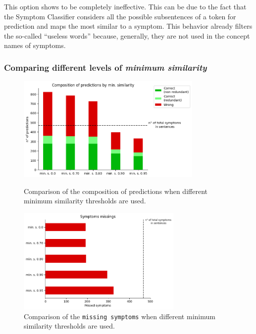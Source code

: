 \begin{itemize}

This option shows to be completely ineffective. This can be due to the fact that the Symptom Classifier considers all the possible subsentences of a token for prediction and maps the most similar to a symptom. This behavior already filters the so-called ``useless words'' because, generally, they are not used in the concept names of symptoms.


\newpage
\subsubsection{Comparing different levels of \textit{minimum similarity}}
\begin{figure}[h]%
  \centering
  \begin{minipage}[b]{0.4\textwidth}
    \includegraphics[width=9cm]{graphs/comparison_min_similarity}
    \caption{Comparison of the composition of predictions when different minimum similarity thresholds are used.}
  \end{minipage}
  \hfill
  \begin{minipage}[b]{0.4\textwidth}
    \includegraphics[width=8cm]{graphs/comparison_min_similarity_missings}
    \caption{Comparison of the \texttt{missing symptoms} when different minimum similarity thresholds are used.}
  \end{minipage}
\end{figure}


\end{itemize}
